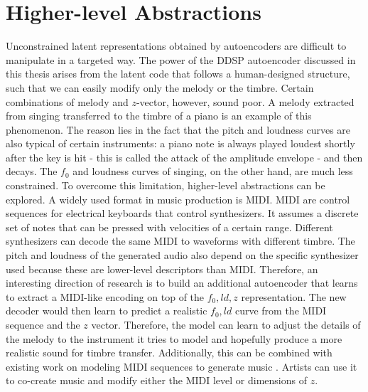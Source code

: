 \section{Higher-level Abstractions}
\label{high}
Unconstrained latent representations obtained by autoencoders are difficult to manipulate in a targeted way. The power of the DDSP autoencoder discussed in this thesis arises from the latent code that follows a human-designed structure, such that we can easily modify only the melody or the timbre. \newline
Certain combinations of melody and $z$-vector, however, sound poor. A melody extracted from singing transferred to the timbre of a piano is an example of this phenomenon. The reason lies in the fact that the pitch and loudness curves are also typical of certain instruments: a piano note is always played loudest shortly after the key is hit - this is called the attack of the amplitude envelope - and then decays. The $f_0$ and loudness curves of singing, on the other hand, are much less constrained. \newline
To overcome this limitation, higher-level abstractions can be explored. A widely used format in music production is MIDI. MIDI are control sequences for electrical keyboards that control synthesizers. It assumes a discrete set of notes that can be pressed with velocities of a certain range. Different synthesizers can decode the same MIDI to waveforms with different timbre. The pitch and loudness of the generated audio also depend on the specific synthesizer used because these are lower-level descriptors than MIDI. \newline
Therefore, an interesting direction of research is to build an additional autoencoder that learns to extract a MIDI-like encoding on top of the $f_0, ld, z$ representation. The new decoder would then learn to predict a realistic $f_0, ld$ curve from the MIDI sequence and the $z$ vector. Therefore, the model can learn to adjust the details of the melody to the instrument it tries to model and hopefully produce a more realistic sound for timbre transfer. \newline
Additionally, this can be combined with existing work on modeling MIDI sequences to generate music \citep{performance-rnn-2017} \citep{roberts_hierarchical_2019}. Artists can use it to co-create music and modify either the MIDI level or dimensions of $z$. \newline



